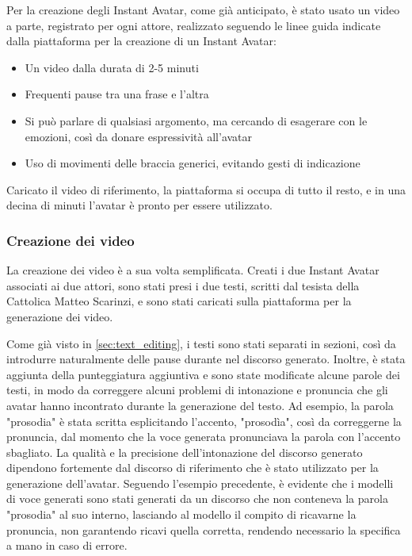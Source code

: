 Per la creazione degli Instant Avatar, come già anticipato, è stato usato un video a parte, registrato per ogni attore, realizzato seguendo le linee guida indicate dalla piattaforma per la creazione di un Instant Avatar:
\begin{itemize}
    \item Un video dalla durata di 2-5 minuti
    \item Frequenti pause tra una frase e l'altra
    \item Si può parlare di qualsiasi argomento, ma cercando di esagerare con le emozioni, così da donare espressività all'avatar
    \item Uso di movimenti delle braccia generici, evitando gesti di indicazione
\end{itemize}

Caricato il video di riferimento, la piattaforma si occupa di tutto il resto, e in una decina di minuti l'avatar è pronto per essere utilizzato.

\subsubsection{Creazione dei video}

La creazione dei video è a sua volta semplificata. Creati i due Instant Avatar associati ai due attori, sono stati presi i due testi, scritti dal tesista della Cattolica Matteo Scarinzi, e sono stati caricati sulla piattaforma per la generazione dei video. 

Come già visto in \ref{sec:text_editing}, i testi sono stati separati in sezioni, così da introdurre naturalmente delle pause durante nel discorso generato. Inoltre, è stata aggiunta della punteggiatura aggiuntiva e sono state modificate alcune parole dei testi, in modo da correggere alcuni problemi di intonazione e pronuncia che gli avatar hanno incontrato durante la generazione del testo. Ad esempio, la parola "prosodia" è stata scritta esplicitando l'accento, "prosodìa", così da correggerne la pronuncia, dal momento che la voce generata pronunciava la parola con l'accento sbagliato. La qualità e la precisione dell'intonazione del discorso generato dipendono fortemente dal discorso di riferimento che è stato utilizzato per la generazione dell'avatar. Seguendo l'esempio precedente, è evidente che i modelli di voce generati sono stati generati da un discorso che non conteneva la parola "prosodia" al suo interno, lasciando al modello il compito di ricavarne la pronuncia, non garantendo ricavi quella corretta, rendendo necessario la specifica a mano in caso di errore.

\clearpage